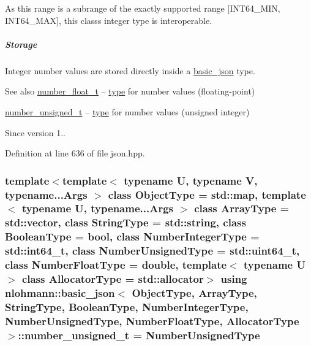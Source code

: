 As this range is a subrange of the exactly supported range \mbox{[}I\+N\+T64\+\_\+\+M\+I\+N, I\+N\+T64\+\_\+\+M\+A\+X\mbox{]}, this class\textquotesingle{}s integer type is interoperable.

\subparagraph*{Storage}

Integer number values are stored directly inside a \hyperlink{classnlohmann_1_1basic__json}{basic\+\_\+json} type.

\begin{DoxySeeAlso}{See also}
\hyperlink{classnlohmann_1_1basic__json_a74a0013e847fdc574b48f931f0e757e1}{number\+\_\+float\+\_\+t} -- \hyperlink{classnlohmann_1_1basic__json_a848cbae3bd3502ffbf738320bf5eb3aa}{type} for number values (floating-\/point)

\hyperlink{classnlohmann_1_1basic__json_a60a04166c122072ab11eaf9845d9cd1d}{number\+\_\+unsigned\+\_\+t} -- \hyperlink{classnlohmann_1_1basic__json_a848cbae3bd3502ffbf738320bf5eb3aa}{type} for number values (unsigned integer)
\end{DoxySeeAlso}
\begin{DoxySince}{Since}
version 1.. 
\end{DoxySince}


Definition at line 636 of file json.\+hpp.

\hypertarget{classnlohmann_1_1basic__json_a60a04166c122072ab11eaf9845d9cd1d}{}
\subsubsection[{number\+\_\+unsigned\+\_\+t}]{\setlength{\rightskip}{0pt plus 5cm}template$<$template$<$ typename U, typename V, typename...\+Args $>$ class Object\+Type = std\+::map, template$<$ typename U, typename...\+Args $>$ class Array\+Type = std\+::vector, class String\+Type  = std\+::string, class Boolean\+Type  = bool, class Number\+Integer\+Type  = std\+::int64\+\_\+t, class Number\+Unsigned\+Type  = std\+::uint64\+\_\+t, class Number\+Float\+Type  = double, template$<$ typename U $>$ class Allocator\+Type = std\+::allocator$>$ using {\bf nlohmann\+::basic\+\_\+json}$<$ Object\+Type, Array\+Type, String\+Type, Boolean\+Type, Number\+Integer\+Type, Number\+Unsigned\+Type, Number\+Float\+Type, Allocator\+Type $>$\+::{\bf number\+\_\+unsigned\+\_\+t} =  Number\+Unsigned\+Type}\label{classnlohmann_1_1basic__json_a60a04166c122072ab11eaf9845d9cd1d}


